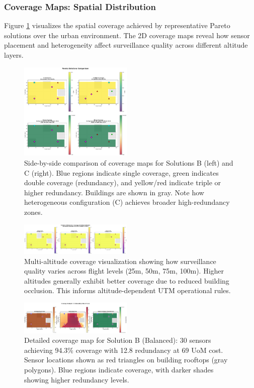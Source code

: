 \subsubsection{Coverage Maps: Spatial Distribution}

Figure \ref{fig:coverage_maps} visualizes the spatial coverage achieved by representative Pareto solutions over the urban environment. The 2D coverage maps reveal how sensor placement and heterogeneity affect surveillance quality across different altitude layers.

\begin{figure}[t]
  \centering
  \includegraphics[width=0.48\textwidth]{figures/pareto_comparison.png}
  \caption{Side-by-side comparison of coverage maps for Solutions B (left) and C (right). Blue regions indicate single coverage, green indicates double coverage (redundancy), and yellow/red indicate triple or higher redundancy. Buildings are shown in gray. Note how heterogeneous configuration (C) achieves broader high-redundancy zones.}
  \label{fig:coverage_maps}
\end{figure}

\begin{figure}[t]
  \centering
  \includegraphics[width=0.48\textwidth]{figures/pareto_multi_altitude.png}
  \caption{Multi-altitude coverage visualization showing how surveillance quality varies across flight levels (25m, 50m, 75m, 100m). Higher altitudes generally exhibit better coverage due to reduced building occlusion. This informs altitude-dependent UTM operational rules.}
  \label{fig:multi_altitude}
\end{figure}

\begin{figure}[t]
  \centering
  \includegraphics[width=0.48\textwidth]{figures/pareto_map_B_Balanced.png}
  \caption{Detailed coverage map for Solution B (Balanced): 30 sensors achieving 94.3\% coverage with 12.8 redundancy at 69 UoM cost. Sensor locations shown as red triangles on building rooftops (gray polygons). Blue regions indicate coverage, with darker shades showing higher redundancy levels.}
  \label{fig:map_balanced}
\end{figure}

